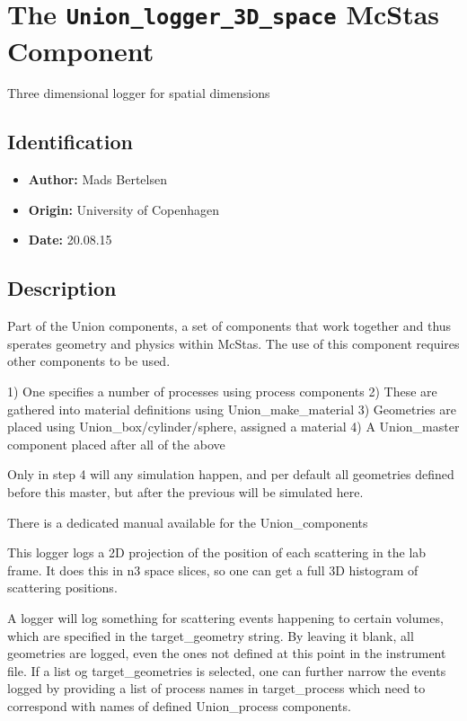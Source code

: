 \section{The \texttt{Union\_logger\_3D\_space} McStas Component}
Three dimensional logger for spatial dimensions

\subsection*{Identification}
\begin{itemize}
  \item \textbf{Author:} Mads Bertelsen
  \item \textbf{Origin:} University of Copenhagen
  \item \textbf{Date:} 20.08.15
\end{itemize}

\subsection*{Description}
Part of the Union components, a set of components that work together and thus sperates geometry and physics within McStas. The use of this component requires other components to be used.

1) One specifies a number of processes using process components 2) These are gathered into material definitions using Union\_make\_material 3) Geometries are placed using Union\_box/cylinder/sphere, assigned a material 4) A Union\_master component placed after all of the above

Only in step 4 will any simulation happen, and per default all geometries defined before this master, but after the previous will be simulated here.

There is a dedicated manual available for the Union\_components

This logger logs a 2D projection of the position of each scattering in the lab frame. It does this in n3 space slices, so one can get a full 3D histogram of scattering positions.

A logger will log something for scattering events happening to certain volumes, which are specified in the target\_geometry string. By leaving it blank, all geometries are logged, even the ones not defined at this point in the instrument file. If a list og target\_geometries is selected, one can further narrow the events logged by providing a list of process names in target\_process which need to correspond with names of defined Union\_process components.

